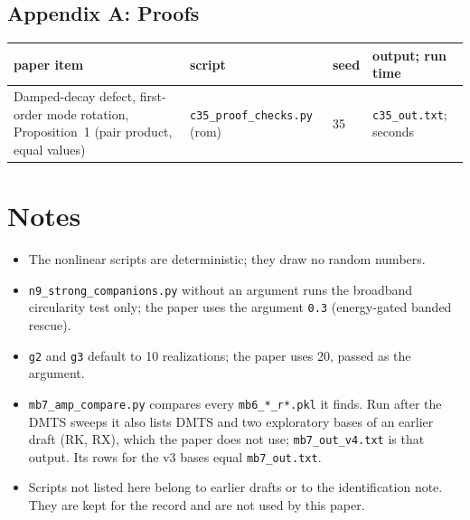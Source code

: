 \documentclass[10pt]{article}
\newcommand{\f}[1]{\texttt{#1}}
\begin{document}
\subsection*{Appendix A: Proofs}
\begin{longtable}{L{0.31\textwidth}L{0.25\textwidth}L{0.08\textwidth}L{0.25\textwidth}}
\toprule
paper item & script & seed & output; run time\\ \midrule
Damped-decay defect, first-order mode rotation, Proposition~1 (pair product, equal values) & \f{c35\_\allowbreak{}proof\_\allowbreak{}checks.py} (rom) & 35 & \f{c35\_\allowbreak{}out.txt}; seconds\\
\bottomrule
\end{longtable}

\section{Notes}
\begin{itemize}
\item The nonlinear scripts are deterministic; they draw no random numbers.
\item \f{n9\_\allowbreak{}strong\_\allowbreak{}companions.py} without an argument runs the broadband circularity test only; the paper uses the argument \f{0.3} (energy-gated banded rescue).
\item \f{g2} and \f{g3} default to 10 realizations; the paper uses 20, passed as the argument.
\item \f{mb7\_\allowbreak{}amp\_\allowbreak{}compare.py} compares every \f{mb6\_\allowbreak{}*\_\allowbreak{}r*.pkl} it finds. Run after the DMTS sweeps it also lists DMTS and two exploratory bases of an earlier draft (RK, RX), which the paper does not use; \f{mb7\_\allowbreak{}out\_\allowbreak{}v4.txt} is that output. Its rows for the v3 bases equal \f{mb7\_\allowbreak{}out.txt}.
\item Scripts not listed here belong to earlier drafts or to the identification note. They are kept for the record and are not used by this paper.
\end{itemize}
\end{document}
